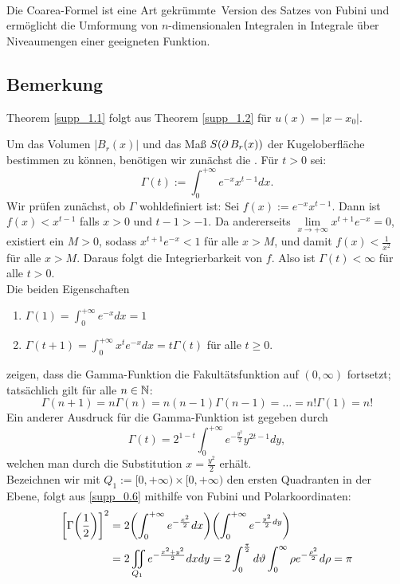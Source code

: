 \mbox{} \\
Die Coarea-Formel ist eine Art \glqq gekrümmte\grqq \ Version des Satzes von Fubini und ermöglicht die Umformung von $n$-dimensionalen Integralen in Integrale über Niveaumengen einer geeigneten Funktion.

\subsection{Bemerkung}
\label{supp_1.3}
	Theorem \ref{supp_1.1} folgt aus Theorem \ref{supp_1.2} für $u(x) = |x-x_0|$.

	Um das Volumen $|B_r(x)|$ und das Maß $S(\operatorname{\partial} B_r(x))$ der Kugeloberfläche bestimmen zu können, benötigen wir zunächst die . Für $t > 0$ sei:
	\begin{equation}
		\Gamma(t) := \int_{0}^{+\infty} e^{-x} x^{t-1} dx. \label{supp_0.5}
	\end{equation}
	Wir prüfen zunächst, ob $\Gamma$ wohldefiniert ist: Sei $f(x) := e^{-x} x^{t-1}$. Dann ist $f(x) < x^{t-1}$ falls $x > 0$ und $t-1 > -1$. Da andererseits $\lim\limits_{x \rightarrow +\infty} x^{t+1}e^{-x} = 0$, existiert ein $M > 0$, sodass $x^{t+1}e^{-x} < 1$ für alle $x > M$, und damit $f(x) < \frac{1}{x^2}$ für alle $x > M$. Daraus folgt die Integrierbarkeit von $f$. Also ist $\Gamma(t) < \infty$ für alle $t > 0$. \\
	Die beiden Eigenschaften
	\begin{enumerate}[(1)]
		\item $\Gamma(1) = \int_{0}^{+\infty} e^{-x} dx = 1$
		\item $\Gamma(t+1) = \int_{0}^{+\infty} x^t e^{-x} dx = t \Gamma(t)$ für alle $t \geq 0$.
	\end{enumerate}
	zeigen, dass die Gamma-Funktion die Fakultätsfunktion auf $(0,\infty)$ fortsetzt; tatsächlich gilt für alle $n \in \mathbb{N}$:
	\[ \Gamma(n+1) = n \Gamma(n) = n(n-1)\Gamma(n-1) = \dots = n!\Gamma(1) = n!\]
	Ein anderer Ausdruck für die Gamma-Funktion ist gegeben durch
	\begin{equation}
		\Gamma(t) = 2^{1-t} \int_0^{+\infty} e^{-\frac{y^2}{2}}y^{2t-1} dy, \label{supp_0.6}
	\end{equation}
	welchen man durch die Substitution $x = \frac{y^2}{2}$ erhält. \\
	Bezeichnen wir mit $Q_1 := [0,+\infty) \times [0,+\infty)$ den ersten Quadranten in der Ebene, folgt aus \eqref{supp_0.6} mithilfe von Fubini und Polarkoordinaten:
	\begin{equation}
	\begin{aligned}
		\left\lbrack \Gamma \enbrace*{\frac{1}{2}} \right\rbrack^2 &= 2 \enbrace*{ \int_0^{+\infty} e^{-\frac{x^2}{2}} dx} \enbrace*{ \int_{0}^{+\infty} e^{-\frac{y^2}{2} dy}} \\ \notag
		&= 2 \iint_{Q_1} e^{-\frac{x^2+y^2}{2}} dxdy = 2 \int_{0}^{\frac{\pi}{2}} d\vartheta \int_0^{\infty} \rho e^{-\frac{\rho^2}{2}} d\rho = \pi
	\end{aligned}
	\end{equation}
